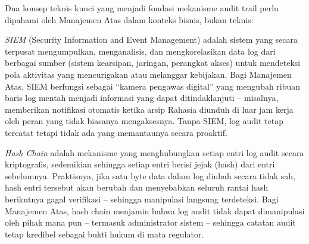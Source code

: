 \documentclass[12pt,a4paper]{report}
\begin{document}
Dua konsep teknis kunci yang menjadi fondasi mekanisme audit trail perlu dipahami oleh Manajemen Atas dalam konteks bisnis, bukan teknis:

\textit{SIEM} (Security Information and Event Management) adalah sistem yang secara terpusat mengumpulkan, menganalisis, dan mengkorelasikan data log dari berbagai sumber (sistem kearsipan, jaringan, perangkat akses) untuk mendeteksi pola aktivitas yang mencurigakan atau melanggar kebijakan. Bagi Manajemen Atas, SIEM berfungsi sebagai ``kamera pengawas digital'' yang mengubah ribuan baris log mentah menjadi informasi yang dapat ditindaklanjuti -- misalnya, memberikan notifikasi otomatis ketika arsip Rahasia diunduh di luar jam kerja oleh peran yang tidak biasanya mengaksesnya. Tanpa SIEM, log audit tetap tercatat tetapi tidak ada yang memantaunya secara proaktif.

\textit{Hash Chain} adalah mekanisme yang menghubungkan setiap entri log audit secara kriptografis, sedemikian sehingga setiap entri berisi jejak (hash) dari entri sebelumnya. Praktisnya, jika satu byte data dalam log diubah secara tidak sah, hash entri tersebut akan berubah dan menyebabkan seluruh rantai hash berikutnya gagal verifikasi -- sehingga manipulasi langsung terdeteksi. Bagi Manajemen Atas, hash chain menjamin bahwa log audit tidak dapat dimanipulasi oleh pihak mana pun -- termasuk administrator sistem -- sehingga catatan audit tetap kredibel sebagai bukti hukum di mata regulator.

\end{document}
